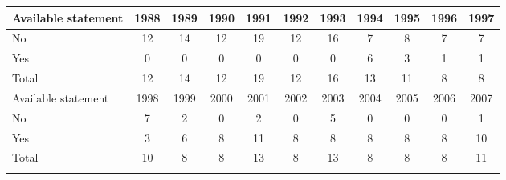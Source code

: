 \begin{tabular}{lcccccccccc}
\hline\hline 
\addlinespace 
Available statement & 1988 & 1989 & 1990 & 1991 & 1992 & 1993 & 1994 & 1995 & 1996 & 1997 \\ 
\hline 
No & 12 & 14 & 12 & 19 & 12 & 16 & 7 & 8 & 7 & 7 \\
Yes & 0 & 0 & 0 & 0 & 0 & 0 & 6 & 3 & 1 & 1 \\
\addlinespace 
Total & 12 & 14 & 12 & 19 & 12 & 16 & 13 & 11 & 8 & 8 \\
\hline 
\addlinespace 
Available statement & 1998 & 1999 & 2000 & 2001 & 2002 & 2003 & 2004 & 2005 & 2006 & 2007 \\ 
\hline 
No & 7 & 2 & 0 & 2 & 0 & 5 & 0 & 0 & 0 & 1 \\
Yes & 3 & 6 & 8 & 11 & 8 & 8 & 8 & 8 & 8 & 10 \\
\addlinespace 
Total & 10 & 8 & 8 & 13 & 8 & 13 & 8 & 8 & 8 & 11 \\
\hline 
\addlinespace 
\end{tabular}